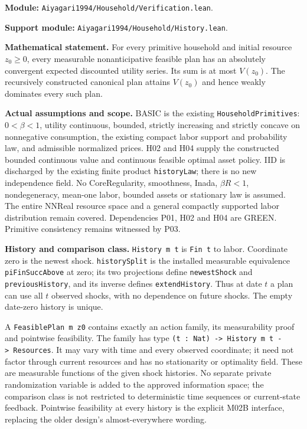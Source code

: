 \documentclass[
  11pt,
]{article}
\let\LedgerOriginalTexttt\texttt
\renewcommand{\texttt}[1]{{\small\LedgerOriginalTexttt{#1}}}
\begin{document}
\textbf{Module:} \texttt{Aiyagari1994/Household/Verification.lean}.

\textbf{Support module:} \texttt{Aiyagari1994/Household/History.lean}.

\textbf{Mathematical statement.} For every primitive household and
initial resource \(z_0\geq0\), every measurable nonanticipative feasible
plan has an absolutely convergent expected discounted utility series.
Its sum is at most \(V(z_0)\). The recursively constructed canonical
plan attains \(V(z_0)\) and hence weakly dominates every such plan.

\textbf{Actual assumptions and scope.} BASIC is the existing
\texttt{HouseholdPrimitives}: \(0<\beta<1\), utility continuous,
bounded, strictly increasing and strictly concave on nonnegative
consumption, the existing compact labor support and probability law, and
admissible normalized prices. H02 and H04 supply the constructed bounded
continuous value and continuous feasible optimal asset policy. IID is
discharged by the existing finite product \texttt{historyLaw}; there is
no new independence field. No CoreRegularity, smoothness, Inada,
\(\beta R<1\), nondegeneracy, mean-one labor, bounded assets or
stationary law is assumed. The entire NNReal resource space and a
general compactly supported labor distribution remain covered.
Dependencies P01, H02 and H04 are GREEN. Primitive consistency remains
witnessed by P03.

\textbf{History and comparison class.} \texttt{History\ m\ t} is
\texttt{Fin\ t} to labor. Coordinate zero is the newest shock.
\texttt{historySplit} is the installed measurable equivalence
\texttt{piFinSuccAbove} at zero; its two projections define
\texttt{newestShock} and \texttt{previousHistory}, and its inverse
defines \texttt{extendHistory}. Thus at date \(t\) a plan can use all
\(t\) observed shocks, with no dependence on future shocks. The empty
date-zero history is unique.

A \texttt{FeasiblePlan\ m\ z0} contains exactly an action family, its
measurability proof and pointwise feasibility. The family has type
\texttt{(t\ :\ Nat)\ -\textgreater{}\ History\ m\ t\ -\textgreater{}\ Resources}.
It may vary with time and every observed coordinate; it need not factor
through current resources and has no stationarity or optimality field.
These are measurable functions of the given shock histories. No separate
private randomization variable is added to the approved information
space; the comparison class is not restricted to deterministic time
sequences or current-state feedback. Pointwise feasibility at every
history is the explicit M02B interface, replacing the older design's
almost-everywhere wording.
\end{document}
